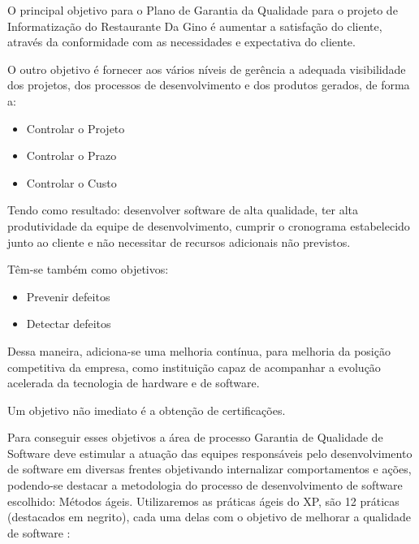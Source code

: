 O principal objetivo para o Plano de Garantia da Qualidade para o projeto de Informatização do Restaurante Da Gino é aumentar a satisfação do cliente, através da conformidade com as necessidades e expectativa do cliente.

O outro objetivo é fornecer aos vários níveis de gerência a adequada visibilidade dos projetos, dos processos de desenvolvimento e dos produtos gerados, de forma a:

\begin{itemize}
\item Controlar o Projeto
\item Controlar o Prazo
\item Controlar o Custo
\end{itemize}

Tendo como resultado: desenvolver software de alta qualidade, ter alta produtividade da equipe de desenvolvimento, cumprir o cronograma estabelecido junto ao cliente e não necessitar de recursos adicionais não previstos.

Têm-se também como objetivos:

\begin{itemize}
  \item Prevenir defeitos
  \item Detectar defeitos
\end{itemize}

Dessa maneira, adiciona-se uma melhoria contínua, para melhoria da posição competitiva da empresa, como instituição capaz de acompanhar a evolução acelerada da tecnologia de hardware e de software.

Um objetivo não imediato é a obtenção de certificações.

Para conseguir esses objetivos a área de processo Garantia de Qualidade de Software deve estimular a atuação das equipes responsáveis pelo desenvolvimento de software em diversas frentes objetivando internalizar comportamentos e ações, podendo-se destacar a metodologia do processo de desenvolvimento de software escolhido: Métodos ágeis. Utilizaremos as práticas ágeis do XP, são 12 práticas (destacados em negrito), cada uma delas com o objetivo de melhorar a qualidade de software \cite{BecAnd04extreme}:

